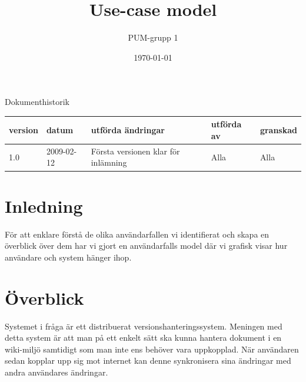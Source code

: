 

\ifpdf
\else
\fi

\title{Use-case model}
\author{PUM-grupp 1}
\date{\today}



\maketitle\thispagestyle{empty}
\newpage


{\centering \Large{Dokumenthistorik\\}}

\vspace{10pt}
\begin{tabularx}{\textwidth}{ |l|l|X|l|l| }
  \hline
    \textbf{version} & \textbf{datum} & \textbf{utförda ändringar} & \textbf{utförda av} & \textbf{granskad} \\
	\hline 
  1.0 & 2009-02-12 &  Första versionen klar för inlämning  & Alla & Alla   \\
  \hline
\end{tabularx}

\newpage
\setcounter{tocdepth}{2}
\tableofcontents
\newpage


\section{Inledning}
För att enklare förstå de olika användarfallen vi identifierat och skapa en överblick över dem har vi gjort en användarfalls model där vi grafisk visar hur användare och system hänger ihop.
\section{Överblick}
Systemet i fråga är ett distribuerat versionshanteringssystem. Meningen med detta system är att man på ett enkelt sätt ska kunna hantera dokument i en wiki-miljö samtidigt som man inte ens behöver vara uppkopplad. När användaren sedan kopplar upp sig mot internet kan denne synkronisera sina ändringar med andra användares ändringar.
